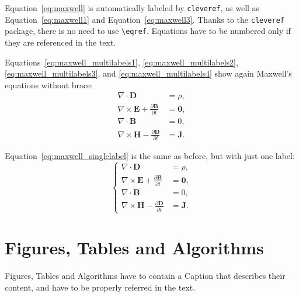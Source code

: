\documentclass[11pt,a4paper]{article}
\begin{document}
Equation~\eqref{eq:maxwell} is automatically labeled by \texttt{cleveref},
as well as Equation~\eqref{eq:maxwell1} and Equation~\eqref{eq:maxwell3}.
Thanks to the \verb|cleveref| package, there is no need to use \verb|\eqref|.
Equations have to be numbered only if they are referenced in the text.

Equations~\eqref{eq:maxwell_multilabels1}, \eqref{eq:maxwell_multilabels2}, \eqref{eq:maxwell_multilabels3}, and \eqref{eq:maxwell_multilabels4} show again Maxwell's equations without brace:
\begin{align}
    \nabla\cdot \bm{D}                                         & = \rho, \label{eq:maxwell_multilabels1}   \\
    \nabla \times \bm{E} +  \frac{\partial \bm{B}}{\partial t} & = \bm{0}, \label{eq:maxwell_multilabels2} \\
    \nabla\cdot \bm{B}                                         & = 0, \label{eq:maxwell_multilabels3}      \\
    \nabla \times \bm{H} - \frac{\partial \bm{D}}{\partial t}  & = \bm{J} \label{eq:maxwell_multilabels4}.
\end{align}

Equation~\eqref{eq:maxwell_singlelabel} is the same as before,
but with just one label:
\begin{equation}
    \label{eq:maxwell_singlelabel}
    \left\{
    \begin{aligned}
        \nabla\cdot \bm{D}                                         & = \rho,   \\
        \nabla \times \bm{E} +  \frac{\partial \bm{B}}{\partial t} & = \bm{0}, \\
        \nabla\cdot \bm{B}                                         & = 0,      \\
        \nabla \times \bm{H} - \frac{\partial \bm{D}}{\partial t}  & = \bm{J}.
    \end{aligned}
    \right.
\end{equation}

\section{Figures, Tables and Algorithms}

Figures, Tables and Algorithms have to contain a Caption that describes their content, and have to be properly referred in the text.
\end{document}
